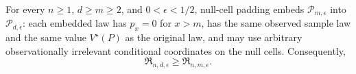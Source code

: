 For every \(n\geq1\), \(d\geq m\geq2\), and \(0<\epsilon<1/2\), null-cell padding embeds \(\mathcal P_{m,\epsilon}\) into \(\mathcal P_{d,\epsilon}\): each embedded law has \(p_x=0\) for \(x>m\), has the same observed sample law and the same value \(V^\star(P)\) as the original law, and may use arbitrary observationally irrelevant conditional coordinates on the null cells. Consequently,
\[
 \mathfrak R_{n,d,\epsilon}\geq \mathfrak R_{n,m,\epsilon}.
\]